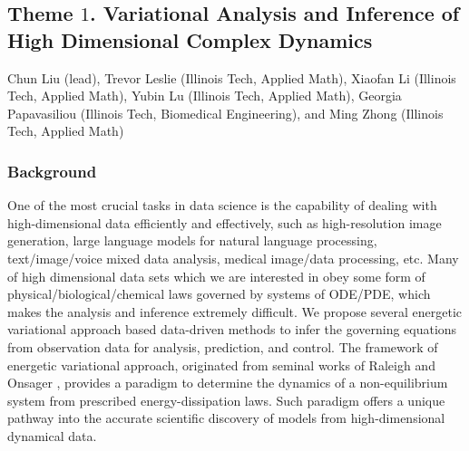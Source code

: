 \documentclass[11pt]{NSFamsart}
\begin{document}
\subsection*{Theme $1$. Variational Analysis and Inference of High Dimensional Complex Dynamics}
Chun Liu (lead), Trevor Leslie (Illinois Tech, Applied Math), Xiaofan Li (Illinois Tech, Applied Math), Yubin Lu (Illinois Tech, Applied Math), Georgia Papavasiliou (Illinois Tech, Biomedical Engineering), and Ming Zhong (Illinois Tech, Applied Math)

\subsubsection*{Background} One of the most crucial tasks in data science is the capability of dealing with high-dimensional data efficiently and effectively, such as high-resolution image generation, large language models for natural language processing, text/image/voice mixed data analysis, medical image/data processing, etc.  Many of high dimensional data sets which we are interested in obey some form of physical/biological/chemical laws governed by systems of ODE/PDE, which makes the analysis and inference extremely difficult.  We propose several energetic variational approach based data-driven methods to infer the governing equations from observation data for analysis, prediction, and control.  The framework of energetic variational approach, originated from seminal works of Raleigh \cite{strutt1871some} and Onsager \cite{onsager1931reciprocal,onsager1931reciprocal2}, provides a paradigm to determine the dynamics of a non-equilibrium system from prescribed energy-dissipation laws.  Such paradigm offers a unique pathway into the accurate scientific discovery of models from high-dimensional dynamical data. 
\end{document}

